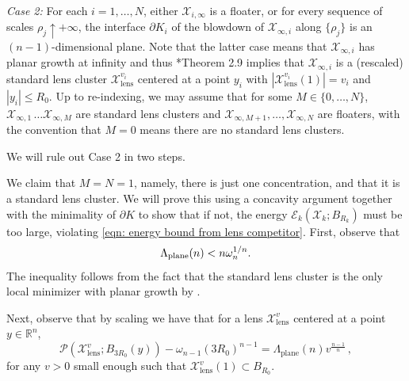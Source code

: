 \documentclass[10pt,reqno]{amsart}
\numberwithin{equation}{section}
\theoremstyle{definition}
\newcommand{\Pcal}{\mathcal{P}}
\newcommand{\R}{\mathbb{R}}
\DeclareMathOperator{\lens}{lens}
\DeclareMathOperator{\plane}{plane}
\newcommand{\X}{\mathcal{X}}
\begin{document}
{\medskip

\textit{Case 2:} For each $i=1,\dots, N $, either $\X_{i,\infty}$ is a floater, or for  every sequence of scales $\rho_j \uparrow + \infty$, the interface $\partial K_i$ of the blowdown of $\X_{\infty,i}$ along $\{\rho_j\}$ is an $(n-1)$-dimensional plane. Note that the latter case means that $\X_{\infty, i}$ has planar growth at infinity and thus
 \cite{BroNov24}*{Theorem 2.9} implies that $\X_{\infty,i}$ is a (rescaled) standard lens cluster $\X_{\lens}^{v_i}$ centered at a point $y_i$ with $|\X_{\lens}^{v_i}(1)| = v_i$ and $|y_i|\leq R_0.$ Up to re-indexing, we may assume that for some $M\in \{0,\dots, N\}$,  $\X_{\infty,1}\,\dots \X_{\infty, M}$  are standard lens clusters and $\X_{\infty,M+1},\dots , \X_{\infty, N}$ are floaters, with the convention that $M=0$ means there are no standard lens clusters.


We will rule out Case 2 in two steps.

 We claim that $M=N=1$, namely, there is just one concentration, and that it is a standard lens cluster.
We will prove this using a concavity argument together with the minimality of $\partial K$ to show that if not, the energy $\mathcal{E}_k(\X_k;B_{R_k})$ must be too large, violating \eqref{eqn: energy bound from lens competitor}. 
First, {observe that 
\begin{equation}\label{eqn: Lambda floater}
    \Lambda_{\rm plane}(n) < n \omega_n^{1/n}.
\end{equation}
The inequality follows from the fact that the standard lens cluster is 
the only local minimizer with planar growth by \cite[Theorem 2.9]{BroNov24}.
}

Next, observe that by scaling we have that for a lens $\X_{\lens}^{v}$ centered at a point $y \in \R^n$,
\begin{equation}
    \label{eqn: scaling lens energy}
\Pcal(\X_{\lens}^{v};B_{3R_0}(y)) - \omega_{n-1} (3R_0)^{n-1} = \Lambda_{\plane}(n) v^{\frac{n-1}{n}}\,,
\end{equation}
for any $v>0$ small enough such that $\X_{\lens}^v(1) \subset B_{R_0}.$

}
\end{document}
